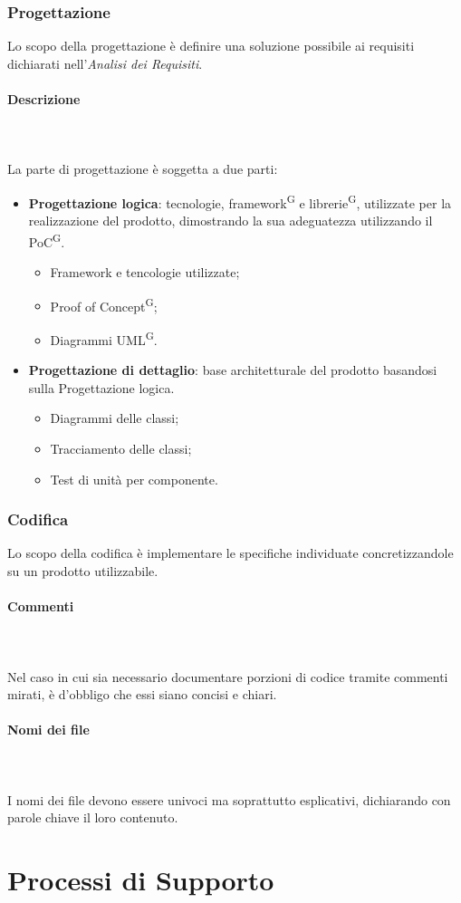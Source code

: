 \documentclass[8pt]{article}
\newcommand{\glossterm}[1]{#1\textsuperscript{G}} %
\newcommand{\subsubsubsection}[1]{\paragraph{#1}\mbox{}\\}
\begin{document}
\subsubsection{Progettazione} \label{sec:progettazione}
Lo scopo della progettazione è definire una soluzione possibile ai requisiti dichiarati nell'\textit{Analisi dei Requisiti}.
\subsubsubsection{Descrizione}\\
La parte di progettazione è soggetta a due parti:
\begin{itemize}
    \item{\textbf{Progettazione logica}}: tecnologie, \glossterm{framework} e \glossterm{librerie}, utilizzate per la realizzazione del prodotto, dimostrando la sua adeguatezza utilizzando il \glossterm{PoC}.
    \begin{itemize}
        \item Framework e tencologie utilizzate;
        \item \glossterm{Proof of Concept};
        \item Diagrammi \glossterm{UML}.
    \end{itemize}
    \item{\textbf{Progettazione di dettaglio}}: base architetturale del prodotto basandosi sulla Progettazione logica.
    \begin{itemize}
        \item Diagrammi delle classi;
        \item Tracciamento delle classi;
        \item Test di unità per componente.
    \end{itemize}
\end{itemize}
\subsubsection{Codifica} \label{sec:codifica}
Lo scopo della codifica è implementare le specifiche individuate concretizzandole su un prodotto utilizzabile.
\subsubsubsection{Commenti}\\
Nel caso in cui sia necessario documentare porzioni di codice tramite commenti mirati, è d'obbligo che essi siano concisi e chiari.
\subsubsubsection{Nomi dei file}\\
I nomi dei file devono essere univoci ma soprattutto esplicativi, dichiarando con parole chiave il loro contenuto.
\newpage
\section{Processi di Supporto} \label{sec:processi_supporto}
\end{document}
